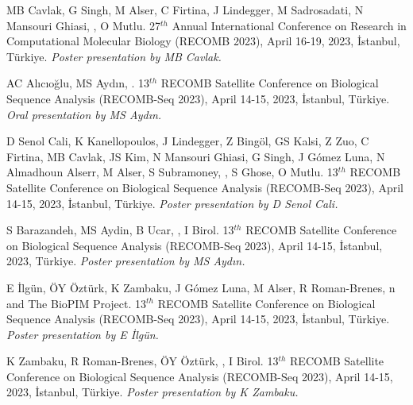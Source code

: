 \vspace{-.2cm}{\bf TargetCall: eliminating the wasted computation in basecalling via pre-basecalling filtering.} MB Cavlak, G Singh, M Alser, C Firtina, J Lindegger, M Sadrosadati, N Mansouri Ghiasi,  \calkan{}, O Mutlu. 27$^{th}$ Annual International Conference on Research in Computational Molecular Biology (RECOMB 2023), April 16-19, 2023, İstanbul, Türkiye. {\it Poster presentation by MB Cavlak.}


\vspace{-.2cm}{\bf Pairwise sequence alignment with block and character edit operations.} AC Alıcıoğlu, MS Aydın, \calkan{}. 13$^{th}$ RECOMB Satellite Conference on Biological Sequence Analysis (RECOMB-Seq 2023), April 14-15, 2023, İstanbul, Türkiye. {\it Oral presentation by MS Aydın.}


\vspace{-.2cm}{\bf SeGraM: a universal hardware accelerator for genomic sequence-to-graph and sequence-to-sequence mapping.} D Senol Cali, K Kanellopoulos, J Lindegger, Z Bingöl, GS Kalsi, Z Zuo, C Firtina, MB Cavlak, JS Kim, N Mansouri Ghiasi, G Singh, J Gómez Luna, N Almadhoun Alserr, M Alser, S Subramoney, \calkan{}, S Ghose, O Mutlu. 13$^{th}$ RECOMB Satellite Conference on Biological Sequence Analysis (RECOMB-Seq 2023), April 14-15, 2023, İstanbul, Türkiye. {\it Poster presentation by D Senol Cali.}

\vspace{-.2cm}{\bf Using minimizer interarrival distances for read-until human read detection from blood samples sequenced by Oxford Nanopore.} S Barazandeh, MS Aydin, B Ucar, \calkan{}, I Birol. 13$^{th}$ RECOMB Satellite Conference on Biological Sequence Analysis (RECOMB-Seq 2023), April 14-15, İstanbul, 2023, Türkiye. {\it Poster presentation by MS Aydın.}


\vspace{-.2cm}{\bf Characterization of alignment and search algorithms for short read, long read, and graph mappers.} E İlgün, ÖY Öztürk, K Zambaku, J Gómez Luna, M Alser, R Roman-Brenes, \calkan{}n and The BioPIM Project. 13$^{th}$ RECOMB Satellite Conference on Biological Sequence Analysis (RECOMB-Seq 2023), April 14-15, 2023, İstanbul, Türkiye. {\it Poster presentation by E İlgün.}

 K Zambaku, R Roman-Brenes, ÖY Öztürk, \calkan{}, I Birol. 13$^{th}$ RECOMB Satellite Conference on Biological Sequence Analysis (RECOMB-Seq 2023), April 14-15, 2023, İstanbul, Türkiye. {\it Poster presentation by K Zambaku.}



